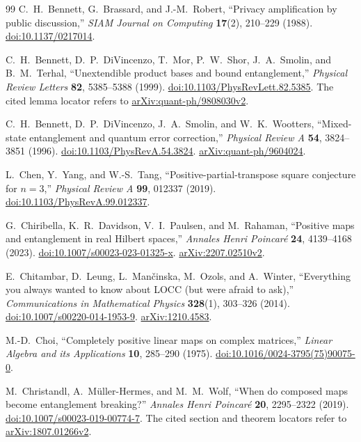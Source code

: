 \begin{thebibliography}{99}
C.~H.~Bennett, G.~Brassard, and J.-M.~Robert,
``Privacy amplification by public discussion,''
\emph{SIAM Journal on Computing} \textbf{17}(2), 210--229 (1988).
\href{https://doi.org/10.1137/0217014}{doi:10.1137/0217014}.

C.~H.~Bennett, D.~P.~DiVincenzo, T.~Mor, P.~W.~Shor, J.~A.~Smolin, and
B.~M.~Terhal,
``Unextendible product bases and bound entanglement,''
\emph{Physical Review Letters} \textbf{82}, 5385--5388 (1999).
\href{https://doi.org/10.1103/PhysRevLett.82.5385}{doi:10.1103/PhysRevLett.82.5385}.
The cited lemma locator refers to
\href{https://arxiv.org/abs/quant-ph/9808030v2}{arXiv:quant-ph/9808030v2}.

C.~H.~Bennett, D.~P.~DiVincenzo, J.~A.~Smolin, and W.~K.~Wootters,
``Mixed-state entanglement and quantum error correction,''
\emph{Physical Review A} \textbf{54}, 3824--3851 (1996).
\href{https://doi.org/10.1103/PhysRevA.54.3824}{doi:10.1103/PhysRevA.54.3824}.
\href{https://arxiv.org/abs/quant-ph/9604024}{arXiv:quant-ph/9604024}.

L.~Chen, Y.~Yang, and W.-S.~Tang,
``Positive-partial-transpose square conjecture for $n=3$,''
\emph{Physical Review A} \textbf{99}, 012337 (2019).
\href{https://doi.org/10.1103/PhysRevA.99.012337}{doi:10.1103/PhysRevA.99.012337}.

G.~Chiribella, K.~R.~Davidson, V.~I.~Paulsen, and M.~Rahaman,
``Positive maps and entanglement in real Hilbert spaces,''
\emph{Annales Henri Poincar\'e} \textbf{24}, 4139--4168 (2023).
\href{https://doi.org/10.1007/s00023-023-01325-x}{doi:10.1007/s00023-023-01325-x}.
\href{https://arxiv.org/abs/2207.02510v2}{arXiv:2207.02510v2}.

E.~Chitambar, D.~Leung, L.~Man\v{c}inska, M.~Ozols, and A.~Winter,
``Everything you always wanted to know about LOCC (but were afraid to ask),''
\emph{Communications in Mathematical Physics} \textbf{328}(1), 303--326 (2014).
\href{https://doi.org/10.1007/s00220-014-1953-9}{doi:10.1007/s00220-014-1953-9}.
\href{https://arxiv.org/abs/1210.4583}{arXiv:1210.4583}.

M.-D.~Choi,
``Completely positive linear maps on complex matrices,''
\emph{Linear Algebra and its Applications} \textbf{10}, 285--290 (1975).
\href{https://doi.org/10.1016/0024-3795(75)90075-0}{doi:10.1016/0024-3795(75)90075-0}.

M.~Christandl, A.~M\"uller-Hermes, and M.~M.~Wolf,
``When do composed maps become entanglement breaking?''
\emph{Annales Henri Poincar\'e} \textbf{20}, 2295--2322 (2019).
\href{https://doi.org/10.1007/s00023-019-00774-7}{doi:10.1007/s00023-019-00774-7}.
The cited section and theorem locators refer to
\href{https://arxiv.org/abs/1807.01266v2}{arXiv:1807.01266v2}.


\end{thebibliography}
